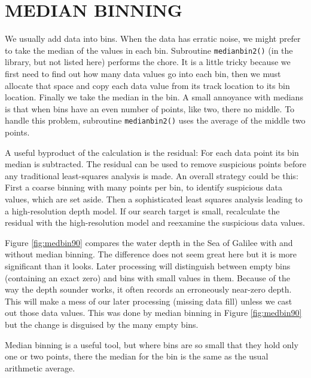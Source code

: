\section{MEDIAN BINNING}
We usually add data into bins.
When the data has erratic noise,
we might prefer to take the median of the values in each bin.
Subroutine \texttt{medianbin2()}
(in the library, but not listed here)
performs the chore.
It is a little tricky because we first need to find out
how many data values go into each bin,
then we must allocate that space
and copy each data value from its track location to its
bin location.
Finally we take the median in the bin.
A small annoyance with medians
is that when bins have an even number of points,
like two, there no middle.
To handle this problem,
subroutine \texttt{medianbin2()}
uses the average of the middle two points.

\par
A useful byproduct of the calculation is the residual:
For each data point its bin median is subtracted.
The residual can be used to remove suspicious points
before any traditional least-squares analysis is made.
An overall strategy could be this:
First a coarse binning with many points per bin,
to identify suspicious data values,
which are set aside.
Then a sophisticated least squares analysis
leading to a high-resolution depth model.
If our search target is small, 
recalculate the residual with the high-resolution model
and reexamine the suspicious data values.

\par
Figure \ref{fig:medbin90} compares the water depth in the Sea of Galilee
with and without median binning.
The difference does not seem great here
but it is more significant than it looks.
Later processing will distinguish between empty bins (containing an exact zero)
and bins with small values in them.
Because of the way the depth sounder works,
it often records an erroneously near-zero depth.
This will make a mess of our later processing
(missing data fill)
unless we cast out those data values.
This was done by median binning in Figure \ref{fig:medbin90}
but the change is disguised by the many empty bins.

\par
Median binning is a useful tool,
but where bins are so small that they hold only one or two points,
there the median for the bin is the same as the usual arithmetic average.


